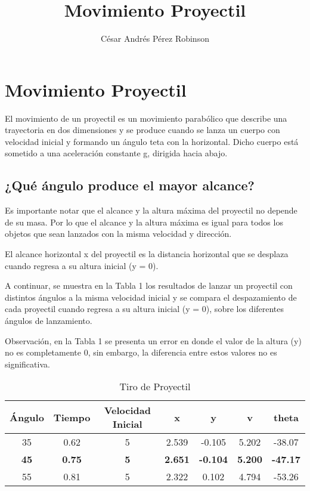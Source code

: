 \documentclass{article}
\title{Movimiento Proyectil}
\author{César Andrés Pérez Robinson}
\begin{document}
\maketitle
\section{Movimiento Proyectil}
    El movimiento de un proyectil es un movimiento parabólico
que describe una trayectoria en dos dimensiones y se produce
cuando se lanza un cuerpo con velocidad inicial y formando 
un ángulo teta con la horizontal. Dicho cuerpo está sometido
a una aceleración constante g, dirigida hacia abajo.

\subsection{¿Qué ángulo produce el mayor alcance?}

    Es importante notar que el alcance y la altura máxima 
del proyectil no depende de su masa. Por lo que el alcance y 
la altura máxima es igual para todos los objetos que sean
lanzados con la misma velocidad y dirección.
   
   El alcance horizontal x del proyectil es la distancia 
horizontal que se desplaza cuando regresa a su altura 
inicial (y = 0).

    A continuar, se muestra en la Tabla 1 los resultados de 
lanzar un proyectil con distintos ángulos a la misma
velocidad inicial y se compara el despazamiento de cada
proyectil cuando regresa a su altura inicial (y = 0), sobre
los diferentes ángulos de lanzamiento.

    Observación, en la Tabla 1 se presenta un error en donde 
el valor de la altura (y) no es completamente 0, sin embargo,
la diferencia entre estos valores no es significativa.


    
\begin{table}[]
\centering
\caption{Tiro de Proyectil}
\label{my-label}
\begin{tabular}{ccccccc}
\hline
Ángulo      & Tiempo        & Velocidad Inicial & x              & y               & v              & theta           \\ \hline
35          & 0.62          & 5                 & 2.539          & -0.105          & 5.202          & -38.07          \\
\textbf{45} & \textbf{0.75} & \textbf{5}        & \textbf{2.651} & \textbf{-0.104} & \textbf{5.200} & \textbf{-47.17} \\
55          & 0.81          & 5                 & 2.322          & 0.102           & 4.794          & -53.26          \\ \hline
\end{tabular}
\end{table}
\end{document}
